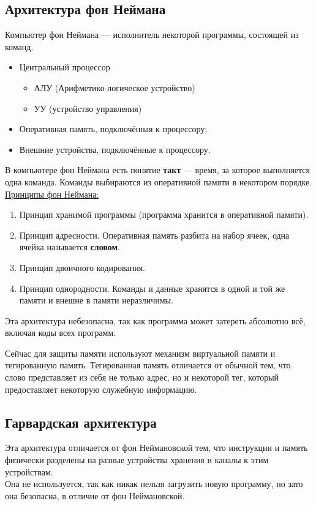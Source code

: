 \subsection*{Архитектура фон Неймана}

Компьютер фон Неймана --- исполнитель некоторой программы, состоящей из команд.

\begin{itemize}
\item Центральный процессор
\begin{itemize}
\item АЛУ (Арифметико-логическое устройство)
\item УУ (устройство управления)
\end{itemize}
\item Оперативная память, подключённая к процессору;
\item Внешние устройства, подключённые к процессору.
\end{itemize}

В компьютере фон Неймана есть понятие \textbf{такт} --- время, за которое выполняется одна команда. Команды выбираются из оперативной памяти в некотором порядке.\\

\underline{Принципы фон Неймана:}
\begin{enumerate}
\item Принцип хранимой программы (программа хранится в оперативной памяти).
\item Принцип адресности. Оперативная память разбита на набор ячеек, одна ячейка называется \textbf{словом}.
\item Принцип двоичного кодирования.
\item Принцип однородности. Команды и данные хранятся в одной и той же памяти и внешне в памяти неразличимы.
\end{enumerate}

Эта архитектура небезопасна, так как программа может затереть абсолютно всё, включая коды всех программ.

Сейчас для защиты памяти используют механизм виртуальной памяти и тегированную память. Тегированная память отличается от обычной тем, что слово представляет из себя не только адрес, но и некоторой тег, который предоставляет некоторую служебную информацию.

\subsection*{Гарвардская архитектура}

Эта архитектура отличается от фон Неймановской тем, что инструкции и память физически разделены на разные устройства хранения и каналы к этим устройствам.\\
Она не используется, так как никак нельзя загрузить новую программу, но зато она безопасна, в отличие от фон Неймановской.